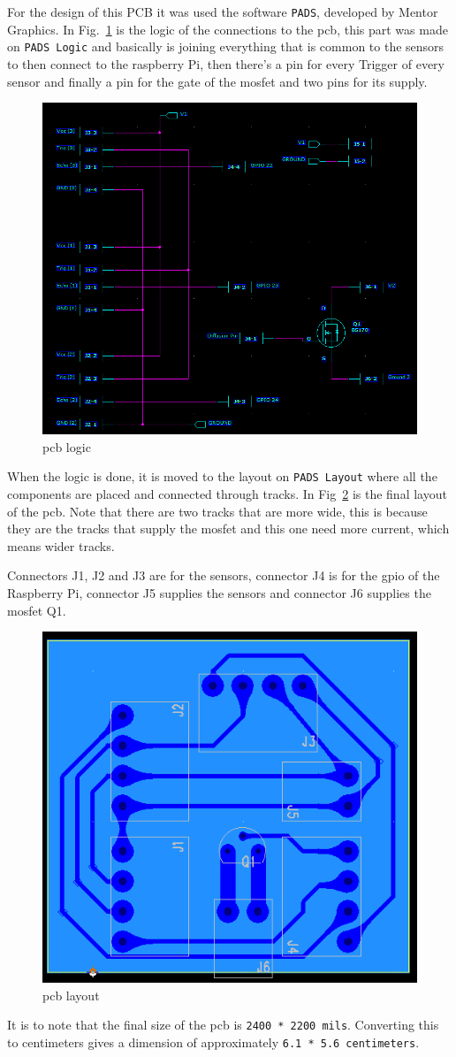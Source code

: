 For the design of this PCB it was used the software \texttt{PADS}, developed by Mentor Graphics.
In Fig.~\ref{fig:pcb-logic} is the logic of the connections to the \gls{pcb}, this part was made on \texttt{PADS Logic} and basically is joining everything that is common to the sensors to then connect to the raspberry Pi, then there's a pin for every Trigger of every sensor and finally a pin for the gate of the \gls{mosfet} and two pins for its supply.
%
\begin{figure}[htb!]
\centering
    \includegraphics[width=0.7\columnwidth]{./img/pcb-logic.png}
  \caption{\gls{pcb} logic}%
\label{fig:pcb-logic}
\end{figure}

When the logic is done, it is moved to the layout on \texttt{PADS Layout} where all the components are placed and connected through tracks. In Fig~\ref{fig:pcb-layout} is the final layout of the \gls{pcb}. Note that there are two tracks that are more wide, this is because they are the tracks that supply the \gls{mosfet} and this one need more current, which means wider tracks.

Connectors J1, J2 and J3 are for the sensors, connector J4 is for the \gls{gpio} of the Raspberry Pi, connector J5 supplies the sensors and connector J6 supplies the \gls{mosfet} Q1.
%
\begin{figure}[htb!]
\centering
    \includegraphics[width=0.6\columnwidth]{./img/pcb-layout.png}
  \caption{\gls{pcb} layout}%
\label{fig:pcb-layout}
\end{figure}

It is to note that the final size of the \gls{pcb} is \texttt{2400 * 2200 mils}. Converting this to centimeters gives a dimension of approximately \texttt{6.1 * 5.6 centimeters}.
%  
